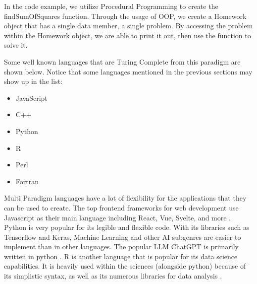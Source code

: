 In the code example, we utilize Procedural Programming to create the findSumOfSquares function.
Through the usage of OOP, we create a Homework object that has a single data member, a single problem.
By accessing the problem within the Homework object, we are able to print it out, then use the function to solve it.

Some well known languages that are Turing Complete from this paradigm are shown below.
Notice that some languages mentioned in the previous sections may show up in the list: 
\begin{itemize}
    \item JavaScript
    \item C++
    \item Python
    \item R
    \item Perl
    \item Fortran
\end{itemize}

Multi Paradigm languages have a lot of flexibility for the applications that they can be used to create.
The top frontend frameworks for web development use Javascript as their main language including React, Vue, Svelte, and more \cite{JSPopular}.
Python is very popular for its legible and flexible code.
With its libraries such as Tensorflow and Keras, Machine Learning and other AI subgenres are easier to implement than in other languages.
The popular LLM ChatGPT is primarily written in python \cite{ChatGPTPython}.
R is another language that is popular for its data science capabilities.
It is heavily used within the sciences (alongside python) because of its simplistic syntax, as well as its numerous libraries for data analysis \cite{RDataSci,DataSciLangs}.






